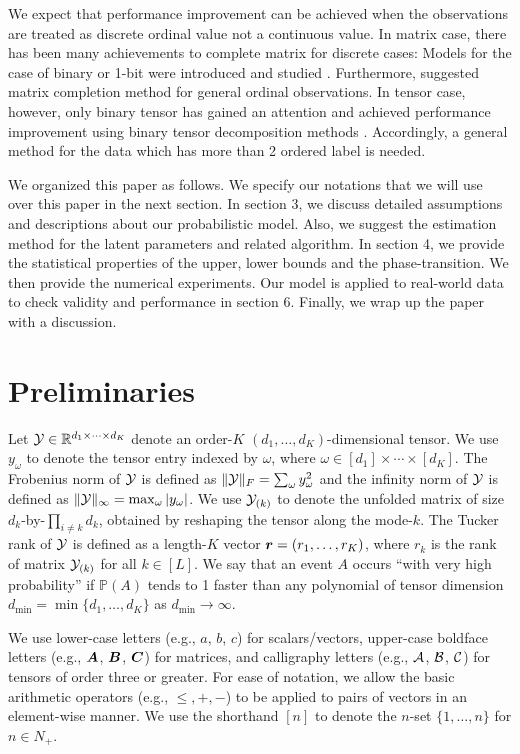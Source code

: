 \documentclass{article}
\theoremstyle{plain}
\theoremstyle{definition}
\begin{document}
We expect that performance improvement can be achieved when the observations are treated as discrete ordinal value not a continuous value.
In matrix case, there has been many achievements to complete matrix for discrete cases: Models for the case of binary or 1-bit were introduced and studied \citep{davenport20141,bhaskar20151}. Furthermore,  \citet{bhaskar2016probabilistic} suggested matrix completion method for general ordinal observations.
In tensor case, however, only binary tensor has gained an attention and achieved performance improvement using binary tensor decomposition methods \citep{hore2016tensor,wang2018learning,hong2018generalized,hu2018training}. Accordingly, a general method for the data which has more than 2 ordered label is needed.

We organized this paper as follows. We specify our notations that we will use over this paper in the next section.
In section 3, we discuss detailed assumptions and descriptions about our probabilistic model. Also, we suggest the estimation method for the latent parameters and related algorithm.
In section 4, we provide the statistical properties of the upper, lower bounds and the phase-transition.
We then provide the numerical experiments.
Our model is applied to  real-world data to check validity and performance in section 6.
Finally, we wrap up the paper with a discussion.

\section{Preliminaries}
Let $\mathcal{Y}\in\mathbb{R}^{d_1\times \cdots \times d_K}$ denote an order-$K$ $(d_1,\ldots,d_K)$-dimensional tensor. We use $y_\omega$ to denote the tensor entry indexed by $\omega$, where $\omega\in[d_1]\times\cdots\times[d_K]$.  The Frobenius norm of $\mathcal{Y}$ is defined as $\lVert\mathcal{Y}\rVert_F=\sum_\omega y^2_\omega$ and the infinity norm of $\mathcal{Y}$ is defined as $\lVert\mathcal{Y}\rVert_\infty=\max_{\omega}|y_\omega|$. We use $\mathcal{Y}_{(k)}$ to denote the unfolded matrix of size $d_k$-by-$\prod_{i\neq k}d_k$, obtained by reshaping the tensor along the mode-$k$. The Tucker rank of $\mathcal{Y}$ is defined as a length-$K$ vector $\bm{r} = (r_1,\ldots,r_K)$, where $r_k$ is the rank of matrix $\mathcal{Y}_{(k)}$ for all $k \in[L]$. We say that an event $A$ occurs ``with very high probability'' if $\mathbb{P}(A)$ tends to 1 faster than any polynomial of tensor dimension $d_{\min}=\min\{d_1,\ldots,d_K\}$ as $d_{\min}\to\infty$.

We use lower-case letters (e.g., $a$, $b$, $c$) for scalars/vectors, upper-case boldface letters (e.g., $\bm A$, $\bm B$, $\bm C$) for matrices, and calligraphy letters (e.g., $\mathcal{A}$, $\mathcal{B}$, $\mathcal{C}$) for tensors of order three or greater. For ease of notation, we allow the basic arithmetic operators (e.g., $\leq, +, -$) to be applied to pairs of vectors in an element-wise manner. We use the shorthand $[n]$ to denote the $n$-set $\{1,\ldots,n\}$ for $n \in N_{+}$.
\end{document}
